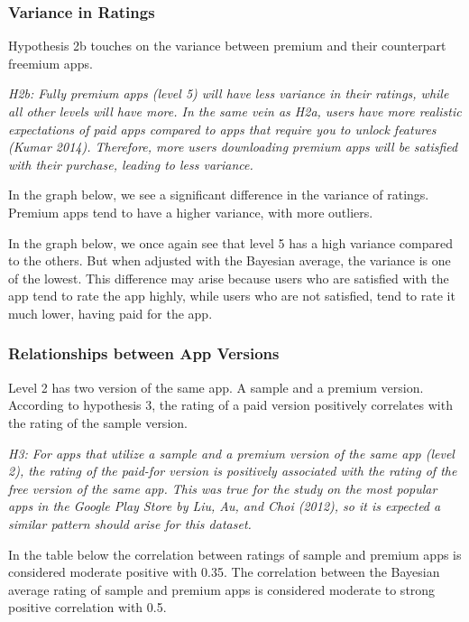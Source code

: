 \documentclass[
  12pt,
  a4paper,
]{article}
\begin{document}
\subsubsection{Variance in Ratings}\label{variance-in-ratings}

Hypothesis 2b touches on the variance between premium and their
counterpart freemium apps.

\emph{H2b: Fully premium apps (level 5) will have less variance in their
ratings, while all other levels will have more. In the same vein as H2a,
users have more realistic expectations of paid apps compared to apps
that require you to unlock features (Kumar 2014). Therefore, more users
downloading premium apps will be satisfied with their purchase, leading
to less variance.}

In the graph below, we see a significant difference in the variance of
ratings. Premium apps tend to have a higher variance, with more
outliers.

In the graph below, we once again see that level 5 has a high variance
compared to the others. But when adjusted with the Bayesian average, the
variance is one of the lowest. This difference may arise because users
who are satisfied with the app tend to rate the app highly, while users
who are not satisfied, tend to rate it much lower, having paid for the
app.

\subsubsection{Relationships between App
Versions}\label{relationships-between-app-versions}

Level 2 has two version of the same app. A sample and a premium version.
According to hypothesis 3, the rating of a paid version positively
correlates with the rating of the sample version.

\emph{H3: For apps that utilize a sample and a premium version of the
same app (level 2), the rating of the paid-for version is positively
associated with the rating of the free version of the same app. This was
true for the study on the most popular apps in the Google Play Store by
Liu, Au, and Choi (2012), so it is expected a similar pattern should
arise for this dataset.}

In the table below the correlation between ratings of sample and premium
apps is considered moderate positive with 0.35. The correlation between
the Bayesian average rating of sample and premium apps is considered
moderate to strong positive correlation with 0.5.
\end{document}
